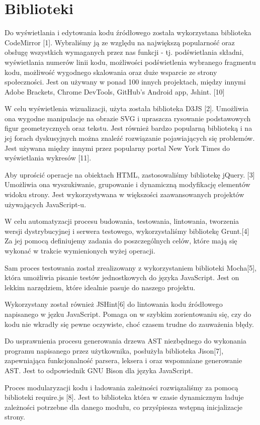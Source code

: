 \documentclass[a4paper,twoside,openright,11pt]{report}
\begin{document}
  \section{Biblioteki}
\par Do wyświetlania i edytowania kodu źródłowego została wykorzystana biblioteka CodeMirror [1]. Wybraliśmy ją ze względu na największą popularność oraz obsługę wszystkich wymaganych przez nas funkcji - tj. podświetlania składni, wyświetlania numerów linii kodu, możliwości podświetlenia wybranego fragmentu kodu, możliwość wygodnego skalowania oraz duże wsparcie ze strony społeczności. Jest on używany w ponad 100 innych projektach, między innymi Adobe Brackets, Chrome DevTools, GitHub's Android app, Jshint. [10]
\par W celu wyświetlenia wizualizacji, użyta została biblioteka D3JS [2]. Umożliwia ona wygodne manipulacje na obrazie SVG i upraszcza rysowanie podstawowych figur geometrycznych oraz tekstu. Jest również bardzo popularną biblioteką i na jej forach dyskusyjnych można znaleźć rozwiązanie pojawiających się problemów. Jest używana między innymi przez popularny portal New York Times do wyświetlania wykresów [11].
\par Aby uprościć operacje na obiektach HTML, zastosowaliśmy bibliotekę jQuery. [3] Umożliwia ona wyszukiwanie, grupowanie i dynamiczną modyfikację elementów widoku strony. Jest wykorzystywana w większości zaawansowanych projektów używających JavaScript-u.
\par W celu automatyzacji procesu budowania, testowania, lintowania, tworzenia wersji dystrybucyjnej i serwera testowego, wykorzystaliśmy bibliotekę Grunt.[4] Za jej pomocą definiujemy zadania do poszczególnych celów, które mają się wykonać w trakcie wymienionych wyżej operacji. 
\par Sam proces testowania został zrealizowany z wykorzystaniem biblioteki Mocha[5], która umożliwia pisanie testów jednostkowych do języka JavaScript. Jest on lekkim narzędziem, które idealnie pasuje do naszego projektu.
\par Wykorzystany został również JSHint[6] do lintowania kodu źródłowego napisanego w jęzku JavaScript. Pomaga on w szybkim zorientowaniu się, czy do kodu nie wkradły się pewne oczywiste, choć czasem trudne do zauważenia błędy.
\par Do usprawnienia procesu generowania drzewa AST niezbędnego do wykonania programu napisanego przez użytkownika, posłużyła biblioteka Jison[7], zapewniająca funkcjonalność parsera, leksera i oraz wspomniane generowanie AST. Jest to odpowiednik GNU Bison dla języka JavaScript.
\par Proces modularyzacji kodu i ładowania zależności rozwiązaliśmy za pomocą biblioteki require.js [8]. Jest to biblioteka która w czasie dynamicznym ładuje zależności potrzebne dla danego modułu, co przyśpiesza wstępną inicjalizacje strony. 
\end{document}
